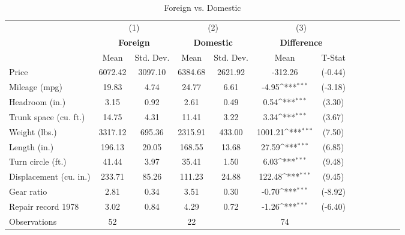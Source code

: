 \begin{table}[htbp]\centering \small 
\def\sym#1{\ifmmode^{#1}\else\(^{#1}\)\fi}
\caption{Foreign vs. Domestic \label{table_balance}}
\begin{tabular}{l*{3}{cccc}}
\toprule
                &\multicolumn{2}{c}{(1)}&\multicolumn{2}{c}{(2)}&\multicolumn{2}{c}{(3)}     \\
                &\multicolumn{2}{c}{\textbf{Foreign}}&\multicolumn{2}{c}{\textbf{Domestic}}&\multicolumn{2}{c}{\textbf{Difference}}\\
                &     Mean&Std. Dev.&     Mean&Std. Dev.&     Mean         &   T-Stat\\
\midrule
Price           &  6072.42&  3097.10&  6384.68&  2621.92&  -312.26         &  (-0.44)\\
Mileage (mpg)   &    19.83&     4.74&    24.77&     6.61&    -4.95\sym{***}&  (-3.18)\\
Headroom (in.)  &     3.15&     0.92&     2.61&     0.49&     0.54\sym{***}&   (3.30)\\
Trunk space (cu. ft.)&    14.75&     4.31&    11.41&     3.22&     3.34\sym{***}&   (3.67)\\
Weight (lbs.)   &  3317.12&   695.36&  2315.91&   433.00&  1001.21\sym{***}&   (7.50)\\
Length (in.)    &   196.13&    20.05&   168.55&    13.68&    27.59\sym{***}&   (6.85)\\
Turn circle (ft.)&    41.44&     3.97&    35.41&     1.50&     6.03\sym{***}&   (9.48)\\
Displacement (cu. in.)&   233.71&    85.26&   111.23&    24.88&   122.48\sym{***}&   (9.45)\\
Gear ratio      &     2.81&     0.34&     3.51&     0.30&    -0.70\sym{***}&  (-8.92)\\
Repair record 1978&     3.02&     0.84&     4.29&     0.72&    -1.26\sym{***}&  (-6.40)\\
\midrule
Observations    &       52&         &       22&         &       74         &         \\
\bottomrule
\end{tabular}
\end{table}
